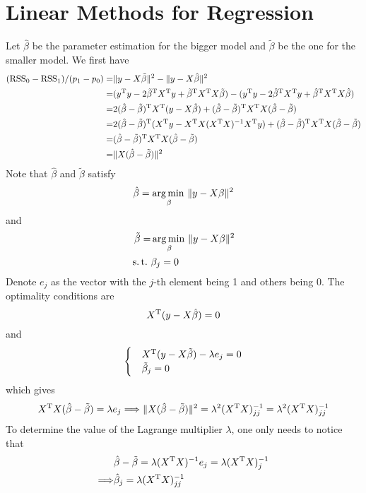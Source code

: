 \section{Linear Methods for Regression}

\begin{sol}
\label{prob:3-1}
Let $\hat{\beta}$ be the parameter estimation for the bigger model and $\tilde{\beta}$ be the one for the smaller model. We first have
\begin{align*}
(\mathrm{RSS}_0-\mathrm{RSS}_1)/(p_1-p_0) = & \|y-X\tilde{\beta}\|^2 - \|y-X\hat{\beta}\|^2 \\
=& (y^{\mathrm{T}}y-2\tilde{\beta}^{\mathrm{T}}X^{\mathrm{T}}y+\tilde{\beta}^{\mathrm{T}}X^{\mathrm{T}}X\tilde{\beta}) - (y^{\mathrm{T}}y-2\hat{\beta}^{\mathrm{T}}X^{\mathrm{T}}y+\hat{\beta}^{\mathrm{T}}X^{\mathrm{T}}X\hat{\beta}) \\
=& 2(\hat{\beta}-\tilde{\beta})^{\mathrm{T}}X^{\mathrm{T}}(y-X\hat{\beta}) + (\hat{\beta}-\tilde{\beta})^{\mathrm{T}}X^{\mathrm{T}}X (\hat{\beta}-\tilde{\beta}) \\
=& 2(\hat{\beta}-\tilde{\beta})^{\mathrm{T}}(X^{\mathrm{T}}y-X^{\mathrm{T}}X(X^{\mathrm{T}}X)^{-1}X^{\mathrm{T}}y) + (\hat{\beta}-\tilde{\beta})^{\mathrm{T}}X^{\mathrm{T}}X (\hat{\beta}-\tilde{\beta}) \\
=& (\hat{\beta}-\tilde{\beta})^{\mathrm{T}}X^{\mathrm{T}}X (\hat{\beta}-\tilde{\beta})\\
=& \|X (\hat{\beta}-\tilde{\beta})\|^2
\end{align*}
Note that $\hat{\beta}$ and $\tilde{\beta}$ satisfy
\[
\hat{\beta}=\operatorname*{arg\,min\,}_\beta\|y-X\beta\|^2
\]
and
\begin{align*}
\tilde{\beta}=&\argmin_\beta\|y-X\beta\|^2\\
\st &\beta_j=0
\end{align*}
Denote $e_j$ as the vector with the $j$-th element being 1 and others being 0. The optimality conditions are
\[
X^{\mathrm{T}}(y-X\hat{\beta})=0
\]
and
\[
\begin{cases}
& X^{\mathrm{T}}(y-X\tilde{\beta})-\lambda e_j=0\\
& \tilde{\beta}_j=0
\end{cases}
\]
which gives
\[
X^{\mathrm{T}}X (\hat{\beta}-\tilde{\beta}) = \lambda e_j \Longrightarrow \|X (\hat{\beta}-\tilde{\beta})\|^2 = \lambda^2 (X^{\mathrm{T}}X)^{-1}_{jj} = \lambda^2 (X^{\mathrm{T}}X)^{-1}_{jj}
\]
To determine the value of the Lagrange multiplier $\lambda$, one only needs to notice that
\begin{align*}
&\hat{\beta}-\tilde{\beta} = \lambda (\Tr{X}X)^{-1} e_j = \lambda (\Tr{X}X)^{-1}_j \\
\Longrightarrow & \hat{\beta}_j = \lambda (\Tr{X}X)^{-1}_{jj} \\

\end{align*}
\end{sol}
